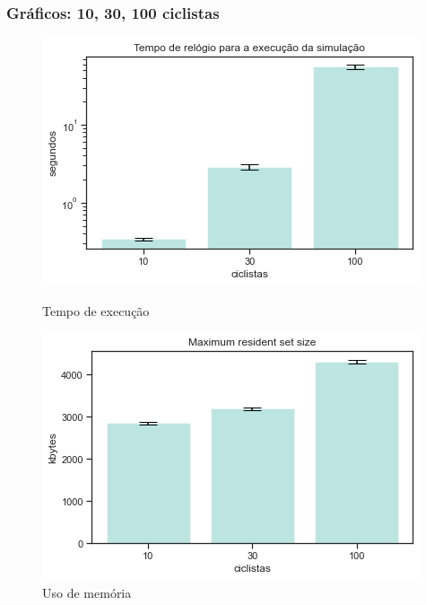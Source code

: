 \documentclass{beamer}
\begin{document}
\begin{frame}
\frametitle{Gráficos: 10, 30, 100 ciclistas}


\begin{figure}[!htb]
  \includegraphics[width=\linewidth]{imgs/ciclistas_tempo}
  \caption{Tempo de execução}\label{fig:awesome_image1}
\endminipage\hfill
{}
  \includegraphics[width=\linewidth]{imgs/ciclistas_memoria}
  \caption{Uso de memória}\label{fig:awesome_image2}
  \endminipage\hfill
\end{figure}



\end{frame}
\end{document}
